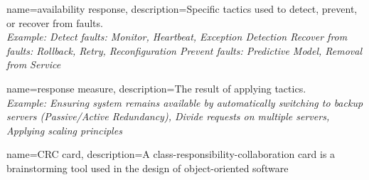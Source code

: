{	name={availability response},
	description={Specific tactics used to detect, prevent, or recover from faults. \\ \textit{Example: Detect faults: Monitor, Heartbeat, Exception Detection Recover from faults: Rollback, Retry, Reconfiguration Prevent faults: Predictive Model, Removal from Service}}
}

{	name={response measure},
	description={The result of applying tactics. \\ \textit{Example: Ensuring system remains available by automatically switching to backup servers (Passive/Active Redundancy), Divide requests on multiple servers, Applying scaling principles}}
}

{   name={CRC card},
        description={A class-responsibility-collaboration card is a brainstorming tool used in the design of object-oriented software}
}